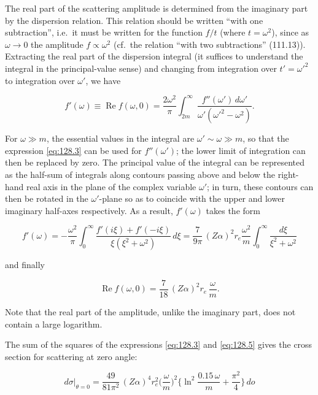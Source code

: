 The real part of the scattering amplitude is determined from the imaginary part by the dispersion relation. This relation should be written ``with one subtraction'', i.e.\ it must be written for the function $f/t$ (where $t = \omega^2$), since as $\omega \to 0$ the amplitude $f \propto \omega^2$ (cf.\ the relation ``with two subtractions'' (111.13)). Extracting the real part of the dispersion integral (it suffices to understand the integral in the principal-value sense) and changing from integration over $t' = \omega'^2$ to integration over $\omega'$, we have

\begin{equation}
f'(\omega) \equiv \operatorname{Re} f(\omega, 0) = \frac{2\omega^2}{\pi} \int_{2m}^{\infty} \frac{f''(\omega')\,d\omega'}{\omega'(\omega'^2 - \omega^2)}.
\label{eq:128.4}
\end{equation}


For $\omega \gg m$, the essential values in the integral are $\omega' \sim \omega \gg m$, so that the expression \eqref{eq:128.3} can be used for $f''(\omega')$; the lower limit of integration can then be replaced by zero. The principal value of the integral can be represented as the half-sum of integrals along contours passing above and below the right-hand real axis in the plane of the complex variable $\omega'$; in turn, these contours can then be rotated in the $\omega'$-plane so as to coincide with the upper and lower imaginary half-axes respectively. As a result, $f'(\omega)$ takes the form

\[
f'(\omega) = -\frac{\omega^2}{\pi} \int_0^{\infty} \frac{f'(i\xi) + f'(-i\xi)}{\xi(\xi^2 + \omega^2)}\,d\xi = \frac{7}{9\pi}\,(Z\alpha)^2 r_e \frac{\omega^2}{m} \int_0^{\infty} \frac{d\xi}{\xi^2 + \omega^2}
\]

and finally

\begin{equation}
\operatorname{Re} f(\omega, 0) = \frac{7}{18}\,(Z\alpha)^2 r_e\,\frac{\omega}{m}.
\label{eq:128.5}
\end{equation}

Note that the real part of the amplitude, unlike the imaginary part, does not contain a large logarithm.

The sum of the squares of the expressions \eqref{eq:128.3} and \eqref{eq:128.5} gives the cross section for scattering at zero angle:

\begin{equation}
\left. d\sigma \right|_{\theta=0} = \frac{49}{81\pi^2}\,(Z\alpha)^4 r_e^2 \biggl(\frac{\omega}{m}\biggr)^{\!2} \biggl\{\ln^2\frac{0.15\,\omega}{m} + \frac{\pi^2}{4}\biggr\}\,do
\label{eq:128.6}
\end{equation}

